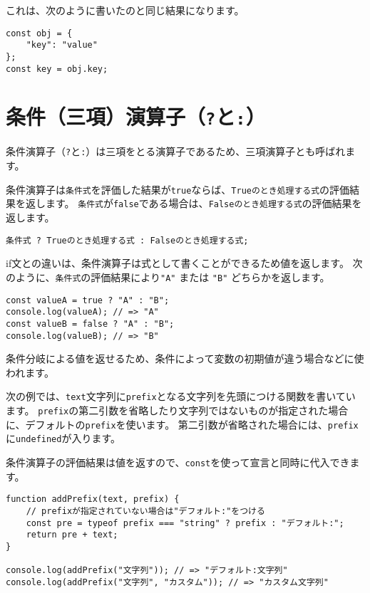 これは、次のように書いたのと同じ結果になります。

\begin{lstlisting}
const obj = {
    "key": "value"
};
const key = obj.key;
\end{lstlisting}

\hypertarget{ternary-operator}{%
\section{\texorpdfstring{条件（三項）演算子（\texttt{?}と\texttt{:}）}{条件（三項）演算子（?と:）}}\label{ternary-operator}}

条件演算子（\texttt{?}と\texttt{:}）は三項をとる演算子であるため、三項演算子とも呼ばれます。

条件演算子は\texttt{条件式}を評価した結果が\texttt{true}ならば、\texttt{Trueのとき処理する式}の評価結果を返します。
\texttt{条件式}が\texttt{false}である場合は、\texttt{Falseのとき処理する式}の評価結果を返します。

\begin{lstlisting}
条件式 ? Trueのとき処理する式 : Falseのとき処理する式;
\end{lstlisting}

if文との違いは、条件演算子は式として書くことができるため値を返します。
次のように、\texttt{条件式}の評価結果により\texttt{"A"}
または \texttt{"B"} どちらかを返します。

\begin{lstlisting}
const valueA = true ? "A" : "B";
console.log(valueA); // => "A"
const valueB = false ? "A" : "B";
console.log(valueB); // => "B"
\end{lstlisting}

条件分岐による値を返せるため、条件によって変数の初期値が違う場合などに使われます。

次の例では、\texttt{text}文字列に\texttt{prefix}となる文字列を先頭につける関数を書いています。
\texttt{prefix}の第二引数を省略したり文字列ではないものが指定された場合に、デフォルトの\texttt{prefix}を使います。
第二引数が省略された場合には、\texttt{prefix}に\texttt{undefined}が入ります。

条件演算子の評価結果は値を返すので、\texttt{const}を使って宣言と同時に代入できます。

\begin{lstlisting}
function addPrefix(text, prefix) {
    // prefixが指定されていない場合は"デフォルト:"をつける
    const pre = typeof prefix === "string" ? prefix : "デフォルト:";
    return pre + text;
}

console.log(addPrefix("文字列")); // => "デフォルト:文字列"
console.log(addPrefix("文字列", "カスタム")); // => "カスタム文字列"
\end{lstlisting}

